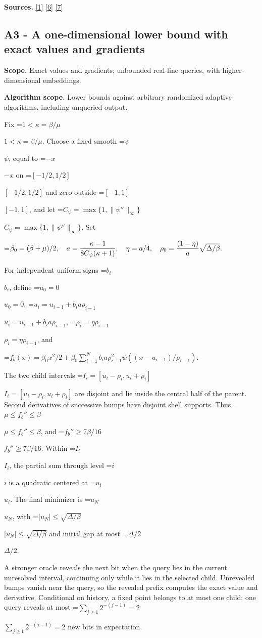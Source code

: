\documentclass[10pt,a4paper]{article}
\newcommand{\AtlasMath}[1]{\par\begingroup\centering\setbox0=\hbox{$\displaystyle #1$}\ifdim\wd0>1.4\linewidth\typeout{ATLAS WIDE FORMULA: \the\wd0}\fi\ifdim\wd0>\linewidth\resizebox{\linewidth}{!}{\box0}\else\box0\fi\par\endgroup}
\newcommand{\AtlasInlineMath}[1]{\begingroup\setbox0=\hbox{$#1$}\ifdim\wd0>.4\linewidth\endgroup\AtlasMath{#1}\else\endgroup$#1$\fi}
\begin{document}
\textbf{Sources.} \href{https://arxiv.org/pdf/1405.4980}{[1]} \href{https://www2.isye.gatech.edu/~nemirovs/MOR_AccuracyCertificates.pdf}{[6]} \href{https://arxiv.org/pdf/2609.20701}{[7]}

\subsection{A3 - A one-dimensional lower bound with exact values and gradients}
\textbf{Scope.} Exact values and gradients; unbounded real-line queries, with higher-dimensional embeddings.

\textbf{Algorithm scope.} Lower bounds against arbitrary randomized adaptive algorithms, including unqueried output.

Fix \AtlasInlineMath{1<\kappa=\beta/\mu}. Choose a fixed smooth \AtlasInlineMath{\psi}, equal to \AtlasInlineMath{-x} on \AtlasInlineMath{[-1/2,1/2]} and zero outside \AtlasInlineMath{[-1,1]}, and let \AtlasInlineMath{C_\psi=\max\{1,\|\psi''\|_\infty\}}. Set

\AtlasMath{\beta_0=(\beta+\mu)/2,\quad a={\kappa-1\over8C_\psi(\kappa+1)},\quad
\eta=a/4,\quad \rho_0={(1-\eta)\over a}\sqrt{\Delta/\beta}.}

For independent uniform signs \AtlasInlineMath{b_i}, define \AtlasInlineMath{u_0=0},
\AtlasInlineMath{u_i=u_{i-1}+b_i a\rho_{i-1}}, \AtlasInlineMath{\rho_i=\eta\rho_{i-1}}, and

\AtlasMath{f_b(x)=\beta_0x^2/2+
\beta_0\sum_{i=1}^N b_i a\rho_{i-1}^2
\psi((x-u_{i-1})/\rho_{i-1}).}

The two child intervals \AtlasInlineMath{I_i=[u_i-\rho_i,u_i+\rho_i]} are disjoint and lie inside the central half of the parent. Second derivatives of successive bumps have disjoint shell supports. Thus \AtlasInlineMath{\mu\le f_b''\le\beta}, and \AtlasInlineMath{f_b''\ge7\beta/16}. Within \AtlasInlineMath{I_i}, the partial sum through level \AtlasInlineMath{i} is a quadratic centered at \AtlasInlineMath{u_i}. The final minimizer is \AtlasInlineMath{u_N}, with \AtlasInlineMath{|u_N|\le\sqrt{\Delta/\beta}} and initial gap at most \AtlasInlineMath{\Delta/2}.

A stronger oracle reveals the next bit when the query lies in the current unresolved interval, continuing only while it lies in the selected child. Unrevealed bumps vanish near the query, so the revealed prefix computes the exact value and derivative. Conditional on history, a fixed point belongs to at most one child; one query reveals at most \AtlasInlineMath{\sum_{j\ge1}2^{-(j-1)}=2} new bits in expectation.
\end{document}
